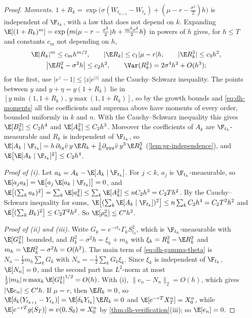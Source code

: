 \begin{proof}
\emph{Moments.} $1+R_k=\exp\big(\sigma(W_{t_{k+1}}-W_{t_k})+(\mu-r-\frac{\sigma^2}{2})h\big)$ is
independent of $\F_{t_k}$, with a law that does not depend on $k$. Expanding
$\E[(1+R_k)^m]=\exp\big(m(\mu-r-\frac{\sigma^2}{2})h+\frac{m^2\sigma^2}{2}h\big)$ in powers of $h$
gives, for $h\le T$ and constants $c_m$ not depending on $h$,
\begin{gather*}
  \E|R_k|^m\le c_mh^{m/2},\qquad |\E R_k|\le c_1|\mu-r|h,\qquad|\E R_k^3|\le c_3h^2,\\
  \big|\E R_k^2-\sigma^2h\big|\le c_2h^2,\qquad\Var(R_k^2)=2\sigma^4h^2+O(h^3);
\end{gather*}
for the first, use $|e^z-1|\le|z|e^{|z|}$ and the Cauchy--Schwarz inequality. The points between
$y$ and $y+\eta=y(1+R_k)$ lie in $[y\min(1,1+R_k),\,y\max(1,1+R_k)]$, so by the growth bounds and
\eqref{eq:dh-moments} all the coefficients and suprema above have moments of every order,
bounded uniformly in $k$ and $n$. With the Cauchy--Schwarz inequality this gives
$\E[B_k^2]\le C_2h^4$ and $\E[A_k^2]\le C_2h^3$. Moreover the coefficients of $A_k$ are
$\F_{t_k}$-measurable and $R_k$ is independent of $\F_{t_k}$, so
$\E[A_k\mid\F_{t_k}]=h\,\partial_{ty}\bar v\,y\,\E R_k+\frac16\partial_{yyy}\bar v\,y^3\,\E R_k^3$
(\cref{lem:pr-independence}), and $\E\big[\E[A_k\mid\F_{t_k}]^2\big]\le C_2h^4$.

\emph{Proof of (i).} Let $a_k=A_k-\E[A_k\mid\F_{t_k}]$. For $j<k$, $a_j$ is
$\F_{t_k}$-measurable, so $\E[a_ja_k]=\E\big[a_j\,\E[a_k\mid\F_{t_k}]\big]=0$, and
$\E\big[(\sum_ka_k)^2\big]=\sum_k\E[a_k^2]\le\sum_k\E[A_k^2]\le nC_2h^3=C_2Th^2$. By the
Cauchy--Schwarz inequality for sums,
$\E\big[(\sum_k\E[A_k\mid\F_{t_k}])^2\big]\le n\sum_k C_2h^4=C_2T^2h^2$ and
$\E\big[(\sum_kB_k)^2\big]\le C_2T^2h^2$. So $\E[\rho_n^2]\le C'h^2$.

\emph{Proof of (ii) and (iii).} Write $G_k=e^{-rt_k}\Gamma_kS_{t_k}^2$, which is
$\F_{t_k}$-measurable with $\E[G_k^2]$ bounded, and
$R_k^2-\sigma^2h=\xi_k+m_h$ with $\xi_k=R_k^2-\E R_k^2$ and $m_h=\E R_k^2-\sigma^2h=O(h^2)$. The
main term of \eqref{eq:dh-gamma-theta} is $N_n-\frac12m_h\sum_kG_k$ with
$N_n=-\frac12\sum_kG_k\xi_k$. Since $\xi_k$ is independent of $\F_{t_k}$, $\E[N_n]=0$, and the
second part has $L^2$-norm at most $\frac12|m_h|\,n\max_k\E[G_k^2]^{1/2}=O(h)$. With (i),
$\|e_n-N_n\|_2=O(h)$, which gives $|\E e_n|\le C'h$. If $\mu=r$, then $\E R_k=0$, so
$\E[\delta_k(Y_{t_{k+1}}-Y_{t_k})]=\E[\delta_kY_{t_k}]\,\E R_k=0$ and $\E[e^{-rT}X^n_T]=X^n_0$, while
$\E[e^{-rT}g(S_T)]=v(0,S_0)=X^n_0$ by \cref{thm:dh-verification}(iii); so $\E[e_n]=0$.


\end{proof}
